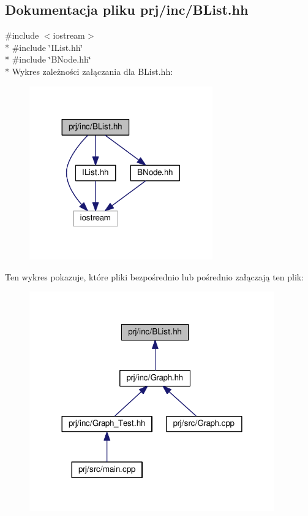 \hypertarget{_b_list_8hh}{\subsection{Dokumentacja pliku prj/inc/\-B\-List.hh}
\label{_b_list_8hh}
}
{\ttfamily \#include $<$iostream$>$}\\*
{\ttfamily \#include \char`\"{}I\-List.\-hh\char`\"{}}\\*
{\ttfamily \#include \char`\"{}B\-Node.\-hh\char`\"{}}\\*
Wykres zależności załączania dla B\-List.\-hh\-:
\nopagebreak
\begin{figure}[H]
\begin{center}
\leavevmode
\includegraphics[width=224pt]{_b_list_8hh__incl}
\end{center}
\end{figure}
Ten wykres pokazuje, które pliki bezpośrednio lub pośrednio załączają ten plik\-:
\nopagebreak
\begin{figure}[H]
\begin{center}
\leavevmode
\includegraphics[width=300pt]{_b_list_8hh__dep__incl}
\end{center}
\end{figure}
